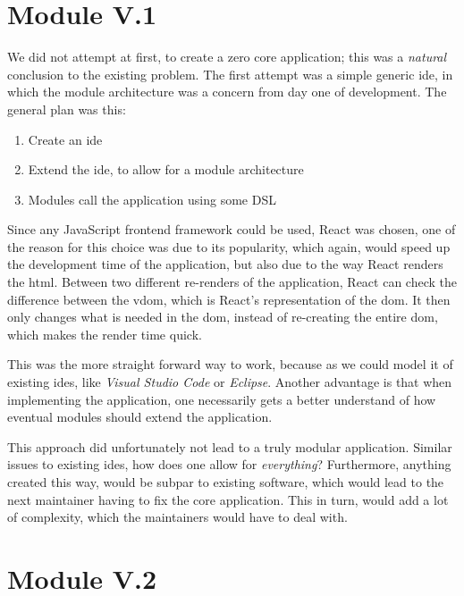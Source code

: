 \section{Module V.1} \label{sec:mod1}

We did not attempt at first, to create a zero core application; this was a
\textit{natural} conclusion to the existing problem. The first attempt was a
simple generic \gls{ide}, in which the module architecture was a concern from
day one of development. The general plan was this:

\begin{enumerate}
  \item Create an \gls{ide}
  \item Extend the \gls{ide}, to allow for a module architecture
  \item Modules call the application using some DSL
\end{enumerate}

Since any JavaScript frontend framework could be used, React was chosen, one of
the reason for this choice was due to its popularity, which again, would speed
up the development time of the application, but also due to the way React
renders the \gls{html}. Between two different re-renders of the application,
React can check the difference between the \gls{vdom}, which is React's
representation of the \gls{dom}. It then only changes what is needed in the
\gls{dom}, instead of re-creating the entire \gls{dom}, which makes the render
time quick.

This was the more straight forward way to work, because as we could model it of
existing \gls{ide}s, like \textit{Visual Studio Code} or \textit{Eclipse}.
Another advantage is that when implementing the application, one necessarily
gets a better understand of how eventual modules should extend the application.

This approach did unfortunately not lead to a truly modular application. Similar
issues to existing \gls{ide}s, how does one allow for \textit{everything}?
Furthermore, anything created this way, would be subpar to existing software,
which would lead to the next maintainer having to fix the core application. This
in turn, would add a lot of complexity, which the maintainers would have to deal with.

\section{Module V.2} \label{sec:mod2}

